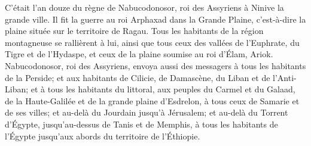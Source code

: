 C’était l'an douze du règne de Nabucodonosor, roi des Assyriens à Ninive la grande ville.
Il fit la guerre au roi Arphaxad dans la Grande Plaine,
	c'est-à-dire la plaine située sur le territoire de Ragau.
Tous les habitants de la région montagneuse se rallièrent à lui,
	ainsi que tous ceux des vallées de l'Euphrate, du Tigre et de l'Hydaspe,
	et ceux de la plaine soumise au roi d'Élam, Ariok.
Nabucodonosor, roi des Assyriens,
	envoya aussi des messagers à tous les habitants de la Perside;
	et aux habitants de Cilicie, de Damascène, du Liban et de l'Anti-Liban;
	et à tous les habitants du littoral, aux peuples du Carmel et du Galaad,
	de la Haute-Galilée et de la grande plaine d'Esdrelon,
	à tous ceux de Samarie et de ses villes;
	et au-delà du Jourdain jusqu'à Jérusalem;
	et au-delà du Torrent d'Égypte, jusqu'au-dessus de Tanis et de Memphis,
	à tous les habitants de l'Égypte jusqu'aux abords du territoire de l'Éthiopie.
